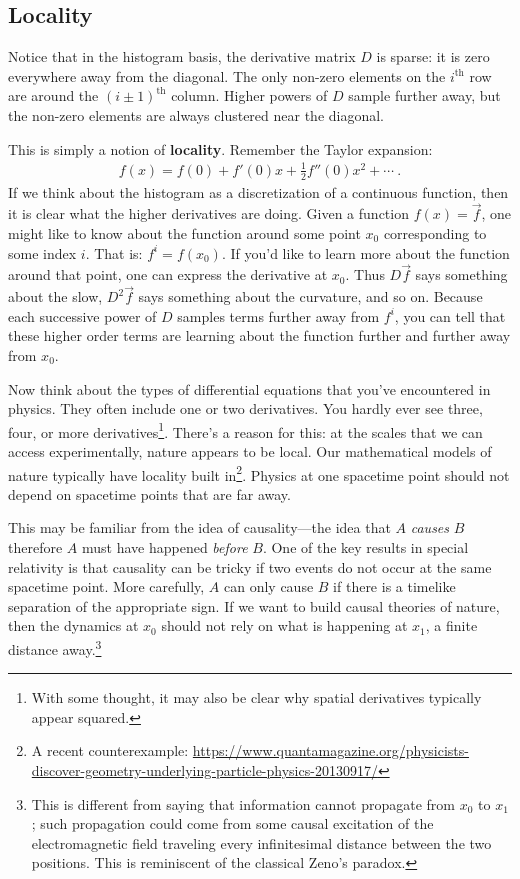\subsection{Locality}

Notice that in the histogram basis, the derivative matrix $D$ is sparse: it is zero everywhere away from the diagonal. The only non-zero elements on the $i^\text{th}$ row are around the $(i\pm 1)^\text{th}$ column.  Higher powers of $D$ sample further away, but the non-zero elements are always clustered near the diagonal.

This is simply a notion of \textbf{locality}. Remember the Taylor expansion:
\begin{align}
  f(x) = f(0) + f'(0) x + \frac{1}{2} f''(0)x^2 + \cdots \ .
\end{align}
If we think about the histogram as a discretization of a continuous function, then it is clear what the higher derivatives are doing. Given a function $f(x) = \vec{f}$, one might like to know about the function around some point $x_0$ corresponding to some index $i$. That is: $f^i = f(x_0)$. If you’d like to learn more about the function around that point, one can express the derivative at $x_0$. Thus $D\vec{f}$ says something about the slow, $D^2\vec{f}$ says something about the curvature, and so on. Because each successive power of $D$ samples terms further away from $f^i$, you can tell that these higher order terms are learning about the function further and further away from $x_0$. 

Now think about the types of differential equations that you’ve encountered in physics. They often include one or two derivatives. You hardly ever see three, four, or more derivatives\footnote{With some thought, it may also be clear why spatial derivatives typically appear squared.}. There’s a reason for this: at the scales that we can access experimentally, nature appears to be local. Our mathematical models of nature typically have locality built in\footnote{A recent counterexample: \url{https://www.quantamagazine.org/physicists-discover-geometry-underlying-particle-physics-20130917/}}. Physics at one spacetime point should not depend on spacetime points that are far away. 

This may be familiar from the idea of causality---the idea that $A$ \emph{causes} $B$ therefore $A$ must have happened \emph{before} $B$. One of the key results in special relativity is that causality can be tricky if two events do not occur at the same spacetime point. More carefully, $A$ can only cause $B$ if there is a timelike separation of the appropriate sign.  If we want to build causal theories of nature, then the dynamics at $x_0$ should not rely on what is happening at $x_1$, a finite distance away.\footnote{This is different from saying that information cannot propagate from $x_0$ to $x_1$; such propagation could come from some causal excitation of the electromagnetic field traveling every infinitesimal distance between the two positions. This is reminiscent of the classical Zeno's paradox.}



